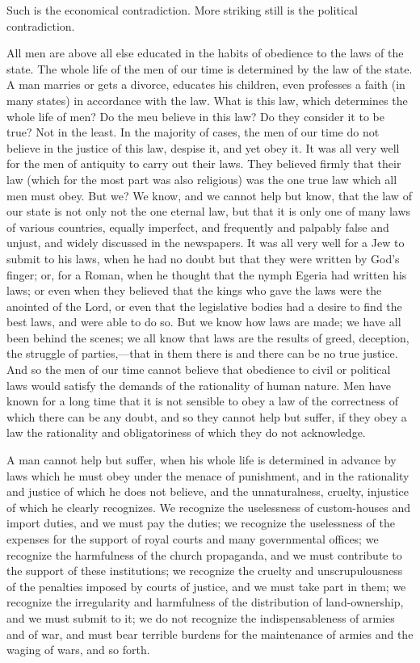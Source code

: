 \documentclass{book}
\begin{document}
Such is the economical contradiction. More striking still is the political contradiction.

All men are above all else educated in the habits of obedience to the laws of the state. The whole life of the men of our time is determined by the law of the state. A man marries or gets a divorce, educates his children, even professes a faith (in many states) in accordance with the law. What is this law, which determines the whole life of men? Do the meu believe in this law? Do they consider it to be true? Not in the least. In the majority of cases, the men of our time do not believe in the justice of this law, despise it, and yet obey it. It was all very well for the men of antiquity to carry out their laws. They believed firmly that their law (which for the most part was also religious) was the one true law which all men must obey. But we? We know, and we cannot help but know, that the law of our state is not only not the one eternal law, but that it is only one of many laws of various countries, equally imperfect, and frequently and palpably false and unjust, and widely discussed in the newspapers. It was all very well for a Jew to submit to his laws, when he had no doubt but that they were written by God’s finger; or, for a Roman, when he thought that the nymph Egeria had written his laws; or even when they believed that the kings who gave the laws were the anointed of the Lord, or even that the legislative bodies had a desire to find the best laws, and were able to do so. But we know how laws are made; we have all been behind the scenes; we all know that laws are the results of greed, deception, the struggle of parties,—that in them there is and there can be no true justice. And so the men of our time cannot believe that obedience to civil or political laws would satisfy the demands of the rationality of human nature. Men have known for a long time that it is not sensible to obey a law of the correctness of which there can be any doubt, and so they cannot help but suffer, if they obey a law the rationality and obligatoriness of which they do not acknowledge.

A man cannot help but suffer, when his whole life is determined in advance by laws which he must obey under the menace of punishment, and in the rationality and justice of which he does not believe, and the unnaturalness, cruelty, injustice of which he clearly recognizes. We recognize the uselessness of custom-houses and import duties, and we must pay the duties; we recognize the uselessness of the expenses for the support of royal courts and many governmental offices; we recognize the harmfulness of the church propaganda, and we must contribute to the support of these institutions; we recognize the cruelty and unscrupulousness of the penalties imposed by courts of justice, and we must take part in them; we recognize the irregularity and harmfulness of the distribution of land-ownership, and we must submit to it; we do not recognize the indispensableness of armies and of war, and must bear terrible burdens for the maintenance of armies and the waging of wars, and so forth.
\end{document}
